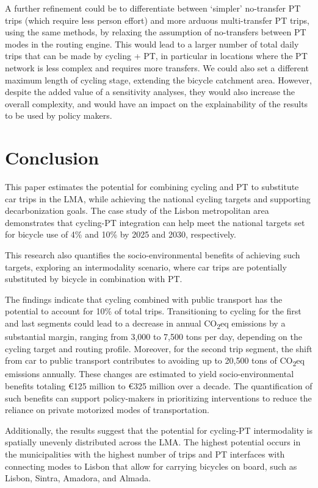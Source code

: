 \documentclass[review, doubleblind, 3p,
authoryear]{elsarticle} %
\begin{document}
A further refinement could be to differentiate between `simpler'
no-transfer PT trips (which require less person effort) and more arduous
multi-transfer PT trips, using the same methods, by relaxing the
assumption of no-transfers between PT modes in the routing engine. This
would lead to a larger number of total daily trips that can be made by
cycling + PT, in particular in locations where the PT network is less
complex and requires more transfers. We could also set a different
maximum length of cycling stage, extending the bicycle catchment area.
However, despite the added value of a sensitivity analyses, they would
also increase the overall complexity, and would have an impact on the
explainability of the results to be used by policy makers.

\section{Conclusion}\label{Conclusions}

This paper estimates the potential for combining cycling and PT to
substitute car trips in the LMA, while achieving the national cycling
targets and supporting decarbonization goals. The case study of the
Lisbon metropolitan area demonstrates that cycling-PT integration can
help meet the national targets set for bicycle use of 4\% and 10\% by
2025 and 2030, respectively.

This research also quantifies the socio-environmental benefits of
achieving such targets, exploring an intermodality scenario, where car
trips are potentially substituted by bicycle in combination with PT.

The findings indicate that cycling combined with public transport has
the potential to account for 10\% of total trips. Transitioning to
cycling for the first and last segments could lead to a decrease in
annual CO\textsubscript{2}eq emissions by a substantial margin, ranging
from 3,000 to 7,500 tons per day, depending on the cycling target and
routing profile. Moreover, for the second trip segment, the shift from
car to public transport contributes to avoiding up to 20,500 tons of
CO\textsubscript{2}eq emissions annually. These changes are estimated to
yield socio-environmental benefits totaling €125 million to €325 million
over a decade. The quantification of such benefits can support
policy-makers in prioritizing interventions to reduce the reliance on
private motorized modes of transportation.

Additionally, the results suggest that the potential for cycling-PT
intermodality is spatially unevenly distributed across the LMA. The
highest potential occurs in the municipalities with the highest number
of trips and PT interfaces with connecting modes to Lisbon that allow
for carrying bicycles on board, such as Lisbon, Sintra, Amadora, and
Almada.
\end{document}
